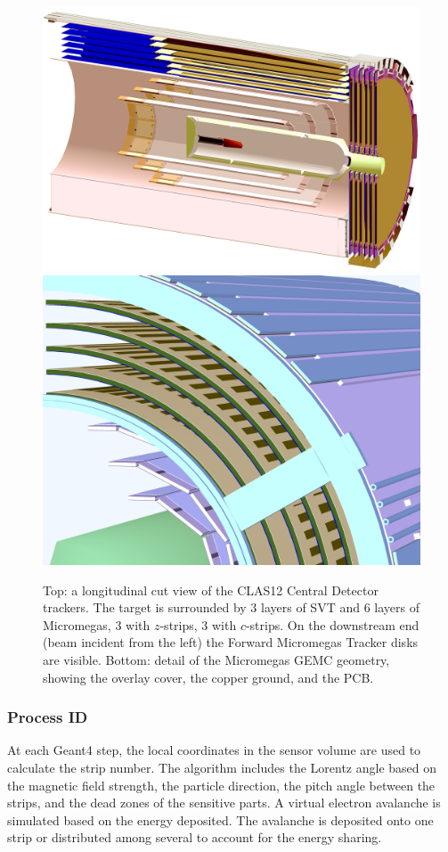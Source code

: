\begin{figure}
	\centering
	\includegraphics[width=0.99\columnwidth,keepaspectratio]{img/bmtGeometry.png}
	\includegraphics[width=0.99\columnwidth,keepaspectratio]{img/bmtDetail.png}
	\caption{Top: a longitudinal cut view of the CLAS12 Central Detector trackers. The target is surrounded by 3 layers of SVT and
            6 layers of Micromegas, 3 with $z$-strips, 3 with $c$-strips. On the downstream end (beam incident from the left)
			   the Forward Micromegas Tracker disks are visible.
            Bottom: detail of the Micromegas GEMC geometry, showing the overlay cover, the copper ground, and the PCB.}
	\label{fig:bmtGeometry}
\end{figure}


\subsubsection{Process ID}
At each Geant4 step, the local coordinates in the sensor volume are used to calculate the strip number.
The algorithm includes the Lorentz angle based on the magnetic field strength, the particle direction,
the pitch angle between the strips, and the dead zones of the sensitive parts.
A virtual electron avalanche is simulated based on the energy deposited. The avalanche
is deposited onto one strip or distributed among several to account for the energy sharing.



